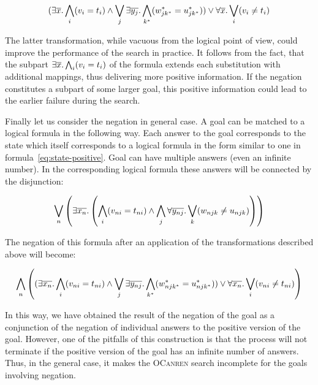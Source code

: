 \begin{equation}
  \label{eq:state-negation-rewritten}  
  (\exists\overline{x}\ldotp \bigwedge_{i}(v_i = t_i) \wedge 
   \bigvee_{j}\exists\overline{y_j}\ldotp
  \bigwedge_{k^*}(w^*_{jk^*} = u^*_{jk^*})) \vee
  \forall\overline{x}\ldotp
  \bigvee_{i}(v_i \neq t_i)
\end{equation}

The latter transformation,
while vacuous from the logical point of view,
could improve the performance of the search in practice.
It follows from the fact, that the subpart 
$\exists\overline{x}\ldotp \bigwedge_{i}(v_i = t_i)$ 
of the formula extends each substitution 
with additional mappings, 
thus delivering more positive information.
If the negation constitutes a subpart of some larger goal,
this positive information could lead to 
the earlier failure during the search.

Finally let us consider the negation in general case.
A goal can be matched to a logical formula in the following way.
Each answer to the goal corresponds to the state
which itself corresponds to a logical formula
in the form similar to one in formula~\ref{eq:state-positive}.
Goal can have multiple answers (even an infinite number).
In the corresponding logical formula these answers 
will be connected by the disjunction:

\begin{equation}
  \label{eq:positive-general}
  \bigvee_{n}\left(
  \exists\overline{x_{n}}\ldotp \left(
  \bigwedge_{i}(v_{ni} = t_{ni}) \wedge
  \bigwedge_{j}\forall\overline{y_{nj}}\ldotp
  \bigvee_{k}(w_{njk} \neq u_{njk})
  \right) \right)
\end{equation}

The negation of this formula after an application of the 
transformations described above will become:

\begin{equation}
  \label{eq:negation-general}  
  \bigwedge_{n}\left(
  (\exists\overline{x_{n}}\ldotp \bigwedge_{i}(v_{ni} = t_{ni}) \wedge 
   \bigvee_{j}\exists\overline{y_{nj}}\ldotp
  \bigwedge_{k^*}(w^*_{njk^*} = u^*_{njk^*})) \vee
  \forall\overline{x_n}\ldotp
  \bigvee_{i}(v_{ni} \neq t_{ni})
  \right)
\end{equation}

In this way, we have obtained the result of the negation of the goal
as a conjunction of the negation of individual answers to the 
positive version of the goal.
However, one of the pitfalls of this construction is 
that the process will not terminate if
the positive version of the goal has an infinite number of answers.
Thus, in the general case, it makes the \textsc{OCanren} search incomplete for the goals involving negation.

